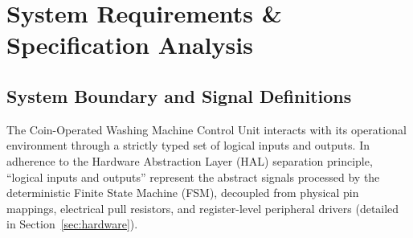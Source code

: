 \section{System Requirements \& Specification Analysis}
\label{sec:requirements}

\subsection{System Boundary and Signal Definitions}

The Coin-Operated Washing Machine Control Unit interacts with its operational environment
through a strictly typed set of logical inputs and outputs. In adherence to the Hardware
Abstraction Layer (HAL) separation principle, ``logical inputs and outputs'' represent the
abstract signals processed by the deterministic Finite State Machine (FSM), decoupled from
physical pin mappings, electrical pull resistors, and register-level peripheral drivers
(detailed in Section~\ref{sec:hardware}).

